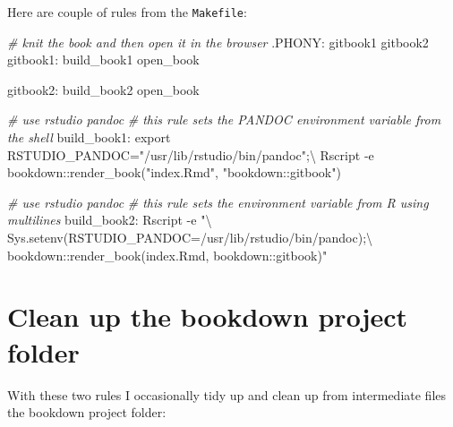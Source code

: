 \documentclass[
]{book}
\newenvironment{Shaded}{\begin{snugshade}}{\end{snugshade}}
\newcommand{\CharTok}[1]{\textcolor[rgb]{0.5,0.5,0.5}{#1}}
\newcommand{\CommentTok}[1]{\textcolor[rgb]{0.37,0.37,0.37}{\textit{#1}}}
\newcommand{\DataTypeTok}[1]{\textcolor[rgb]{0.27,0.27,0.27}{#1}}
\newcommand{\DecValTok}[1]{\textcolor[rgb]{0.06,0.06,0.06}{#1}}
\newcommand{\NormalTok}[1]{#1}
\newcommand{\OtherTok}[1]{\textcolor[rgb]{0.37,0.37,0.37}{#1}}
\newcommand{\StringTok}[1]{\textcolor[rgb]{0.5,0.5,0.5}{#1}}
\begin{document}
Here are couple of rules from the \texttt{Makefile}:

\begin{Shaded}
\begin{Highlighting}[]
\CommentTok{\# knit the book and then open it in the browser}
\OtherTok{.PHONY:}\DataTypeTok{ gitbook1 gitbook2}
\DecValTok{gitbook1:}\DataTypeTok{ build\_book1 open\_book}

\DecValTok{gitbook2:}\DataTypeTok{ build\_book2 open\_book}

\CommentTok{\# use rstudio pandoc}
\CommentTok{\# this rule sets the PANDOC environment variable from the shell}
\DecValTok{build\_book1:}
\NormalTok{    export RSTUDIO\_PANDOC=}\StringTok{"/usr/lib/rstudio/bin/pandoc"}\NormalTok{;}\CharTok{\textbackslash{}}
\NormalTok{    Rscript {-}e }\StringTok{\textquotesingle{}bookdown::render\_book("index.Rmd", "bookdown::gitbook")\textquotesingle{}}

\CommentTok{\# use rstudio pandoc}
\CommentTok{\# this rule sets the environment variable from R using multilines}
\DecValTok{build\_book2:}
\NormalTok{    Rscript {-}e }\StringTok{"}\CharTok{\textbackslash{}}
\StringTok{    Sys.setenv(RSTUDIO\_PANDOC=\textquotesingle{}/usr/lib/rstudio/bin/pandoc\textquotesingle{});}\CharTok{\textbackslash{}}
\StringTok{    bookdown::render\_book(\textquotesingle{}index.Rmd\textquotesingle{}, \textquotesingle{}bookdown::gitbook\textquotesingle{})"}
\end{Highlighting}
\end{Shaded}

\hypertarget{clean-up-the-bookdown-project-folder}{%
\section*{Clean up the bookdown project folder}\label{clean-up-the-bookdown-project-folder}}


With these two rules I occasionally tidy up and clean up from intermediate files the bookdown project folder:
\end{document}
